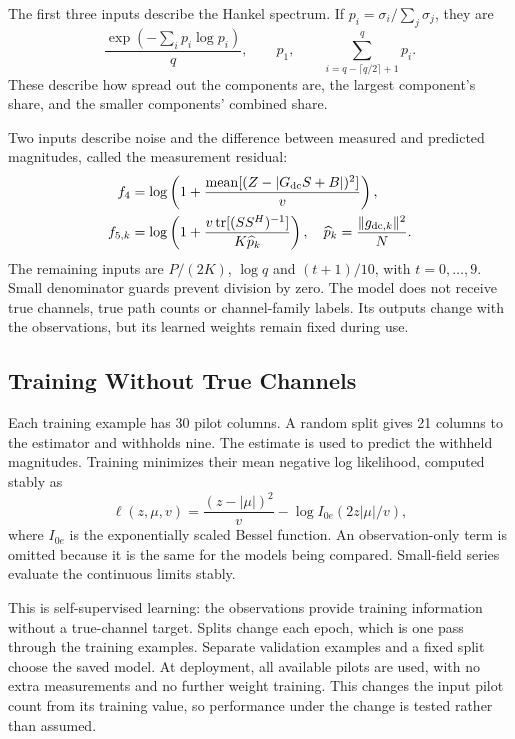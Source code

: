 \documentclass[journal]{IEEEtran}
\DeclareMathOperator{\tr}{tr}
\begin{document}
The first three inputs describe the Hankel spectrum. If
$p_i=\sigma_i/\sum_j\sigma_j$, they are
\begin{equation}
 \frac{\exp(-\sum_i p_i\log p_i)}{q},\qquad p_1,\qquad
 \sum_{i=q-\lceil q/2\rceil+1}^{q}p_i.
\end{equation}
These describe how spread out the components are, the largest component's
share, and the smaller components' combined share.

Two inputs describe noise and the difference between measured and predicted
magnitudes, called the measurement residual:
\begin{align}
 f_4&=\log\left(1+\frac{\operatorname{mean}[(Z-|G_{\rm dc}S+B|)^2]}{v}\right),\\
 f_{5,k}&=\log\left(1+\frac{v\tr[(SS^H)^{-1}]}{K\widehat p_k}\right),
 \quad \widehat p_k=\frac{\|g_{{\rm dc},k}\|^2}{N}.
\end{align}
The remaining inputs are $P/(2K)$, $\log q$ and $(t+1)/10$, with
$t=0,\ldots,9$. Small denominator guards prevent division by zero.
The model does not receive true channels, true path counts or channel-family
labels. Its outputs change with the observations, but its learned weights
remain fixed during use.

\subsection{Training Without True Channels}
Each training example has 30 pilot columns. A random split gives 21 columns
to the estimator and withholds nine. The estimate is used to predict the
withheld magnitudes. Training minimizes their mean negative log likelihood,
computed stably as
\begin{equation}
 \ell(z,\mu,v)=\frac{(z-|\mu|)^2}{v}
 -\log I_{0e}(2z|\mu|/v),
\end{equation}
where $I_{0e}$ is the exponentially scaled Bessel function. An observation-only
term is omitted because it is the same for the models being compared.
Small-field series evaluate the continuous limits stably.

This is self-supervised learning: the observations provide training
information without a true-channel target. Splits change each epoch, which
is one pass through the training examples. Separate validation examples and
a fixed split choose the saved model. At deployment, all available pilots
are used, with no extra measurements and no further weight training. This
changes the input pilot count from its training value, so performance under
the change is tested rather than assumed.
\end{document}
